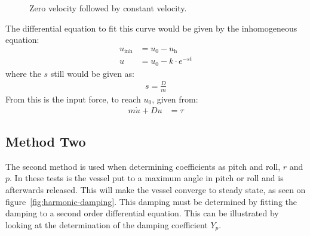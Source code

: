 \begin{figure}[htbp]
	\centering
	
	\caption{Zero velocity followed by constant velocity.}
	\label{fig:phase1}
\end{figure}
The differential equation to fit this curve would be given by the inhomogeneous equation:
\begin{align}
u_{\text{inh}} &= u_0 - u_{\text{h}}\\
u &= u_0 - k \cdot e^{-st}
\end{align}
where the $s$ still would be given as:
\begin{align}
s = \frac{D}{m}
\end{align}
From this is the input force, to reach $u_0$, given from:
\begin{align}
m \dot u + Du &= \tau
\end{align}

\subsection{Method Two}
\label{subsec:methodtwo}
The second method is used when determining coefficients as pitch and roll, $r$ and $p$. In these tests is the vessel put to a maximum angle in pitch or roll and is afterwards released. This will make the vessel converge to steady state, as seen on figure~\vref{fig:harmonic-damping}. This damping must be determined by fitting the damping to a second order differential equation. This can be illustrated by looking at the determination of the damping coefficient $Y_p$.

